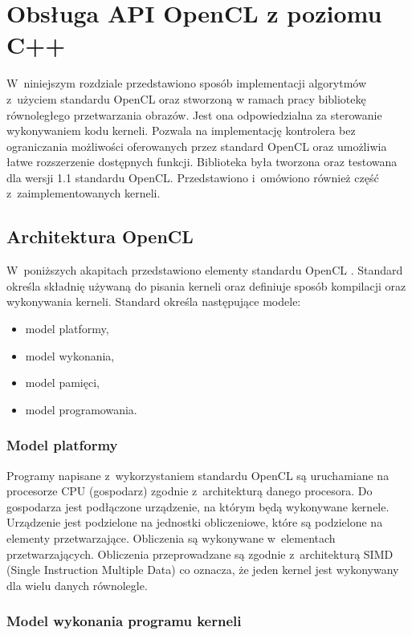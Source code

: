 \chapter{Obsługa API OpenCL z poziomu C++}
\label{cha:opencl}

W~niniejszym rozdziale przedstawiono sposób implementacji algorytmów z~użyciem standardu OpenCL oraz stworzoną w ramach pracy bibliotekę równoległego przetwarzania obrazów. Jest ona odpowiedzialna za sterowanie wykonywaniem kodu kerneli. Pozwala na implementację kontrolera bez ograniczania możliwości oferowanych przez standard OpenCL oraz umożliwia łatwe rozszerzenie dostępnych funkcji. Biblioteka była tworzona oraz testowana dla wersji 1.1 standardu OpenCL. Przedstawiono i~omówiono również część z~zaimplementowanych kerneli.

\section{Architektura OpenCL}
\label{sec:architekturaOpenCL}

W~poniższych akapitach przedstawiono elementy standardu OpenCL \cite{OpenCLspecification}. Standard określa składnię używaną do pisania kerneli oraz definiuje sposób kompilacji oraz wykonywania kerneli. Standard określa następujące modele:
\begin{itemize}
\item model platformy,
\item model wykonania,
\item model pamięci,
\item model programowania.
\end{itemize}

\subsection{Model platformy}
\label{platformModel}

Programy napisane z~wykorzystaniem standardu OpenCL są uruchamiane na procesorze CPU (gospodarz) zgodnie z~architekturą danego procesora. Do gospodarza jest podłączone urządzenie, na którym będą wykonywane kernele. Urządzenie jest podzielone na jednostki obliczeniowe, które są podzielone na elementy przetwarzające. Obliczenia są wykonywane w~elementach przetwarzających. Obliczenia przeprowadzane są zgodnie z~architekturą SIMD (Single Instruction Multiple Data) co oznacza, że jeden kernel jest wykonywany dla wielu danych równolegle.

\subsection{Model wykonania programu kerneli}
\label{executionModel}

